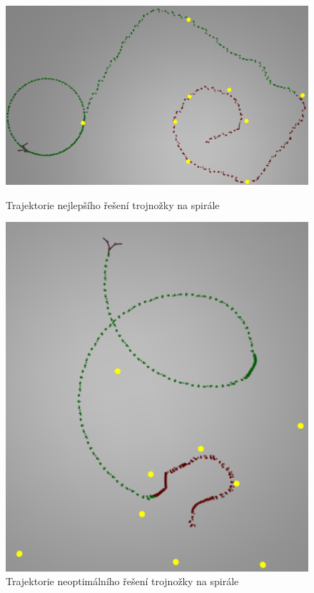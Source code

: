 \begin{figure}[h]
    \begin{minipage}[c]{0.48\linewidth}
        \includegraphics[width=\linewidth]{obrazky/trojnozka_spirala_zhora_nejlepsi_reseni_trajektorie.png}
        \caption{Trajektorie nejlepšího řešení trojnožky na spirále}
        \label{fig:trojnozka_spirala_zhora_nejlepsi_reseni_trajektorie}
    \end{minipage}
    \hfill
    \begin{minipage}[c]{0.48\linewidth}
        \includegraphics[width=\linewidth]{obrazky/trojnozka_spirala_zhora_neoptimalni_reseni_trajektorie.png}
        \caption{Trajektorie neoptimálního řešení trojnožky na spirále}
        \label{fig:trojnozka_spirala_zhora_neoptimalni_reseni_trajektorie}
    \end{minipage}
\end{figure}

